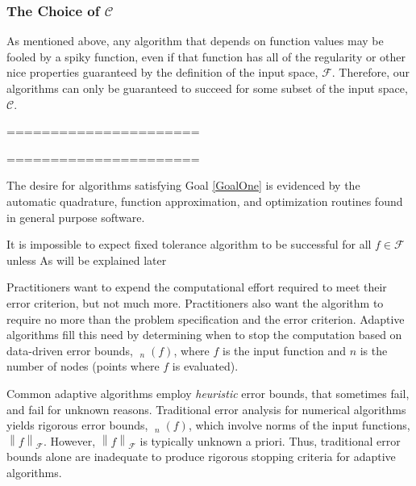 \documentclass[11pt]{NSFamsart}
\DeclareMathOperator{\err}{err}
\DeclareMathOperator{\oerr}{\overline{\err}}
\DeclareMathOperator{\herr}{\widehat{\err}}
\newcommand{\calc}{{\mathcal{C}}}
\newcommand{\calf}{{\mathcal{F}}}
\newcommand{\norm}[2][{}]{\ensuremath{\left \lVert #2 \right \rVert}_{#1}}
\begin{document}
\subsubsection*{The Choice of $\calc$}
As mentioned above, any algorithm that depends on function values may be fooled by a spiky function, even if that function has all of the regularity or other nice properties guaranteed by the definition of the input space, $\calf$.  Therefore, our algorithms can only be guaranteed to succeed for some subset of the input space, $\calc$.

======================

======================





The desire for algorithms satisfying Goal \ref{GoalOne} is evidenced by the automatic quadrature, function approximation, and optimization routines found in general purpose software.  


It is impossible to expect fixed tolerance algorithm to be successful for all $f \in \calf$ unless As will be explained later




Practitioners 
want to expend the  
computational effort required to meet their error criterion, but not much more. 
Practitioners also want the algorithm to require no more than the problem specification and the 
error criterion.   Adaptive algorithms fill this need by determining when to stop the computation 
based on data-driven error bounds, $\herr_n(f)$, where $f$ is the input function and $n$ is the 
number of nodes (points where $f$ is evaluated).



Common adaptive algorithms employ \emph{heuristic} error bounds, that sometimes fail, and fail for 
unknown reasons. Traditional error 
analysis for numerical algorithms 
yields rigorous error bounds, $\oerr_n(f)$, which involve norms of the input functions, 
$\norm[\calf]{f}$.  However, $\norm[\calf]{f}$ is typically unknown a 
priori.  Thus, traditional  error 
bounds alone are inadequate  to produce rigorous stopping criteria for adaptive algorithms.
\end{document}
